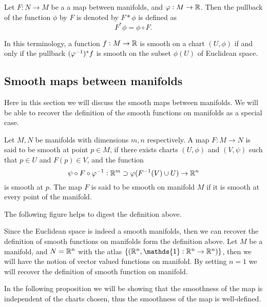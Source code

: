 \begin{definition}
	Let $ F: N\to M $ be a a map between manifolds, and $ \varphi: M \to \mathbb{R} $. Then the pullback of the function $ \phi $ by $ F $ is denoted by $ F*\phi $ is defined as 
	\[ F^* \phi = \phi\circ F. \]
\end{definition}

\begin{remark}
	In this terminology, a function $ f:M \to \mathbb{R} $ is smooth on a chart $ (U,\phi) $ if and only if the pullback $ (\varphi^{-1})^* f$ is smooth on the subset $ \phi(U) $ of Euclidean space.
\end{remark}

\subsection{Smooth maps between manifolds}
Here in this section we will discuss the smooth maps between manifolds. We will be able to recover the definition of the smooth functions on manifolds as a special case. 

\begin{definition}
	Let $ M, N $ be manifolds with dimensions $ m,n $ respectively. A map $ F: M \to N $ is said to be smooth at point $ p \in M $, if there exists charts $ (U,\phi) $ and $ (V,\psi) $ such that $ p \in U $ and $ F(p) \in V $, and the function 
	\[ \psi\circ F \circ \varphi^{-1}: \mathbb{R}^m \supset \varphi(F^{-1}(V) \cup U) \to \mathbb{R}^n  \]
	is smooth at $ p $. The map $ F $ is said to be smooth on manifold $ M $ if it is smooth at every point of the manifold.
\end{definition}
\begin{remark}
	The following figure helps to digest the definition above.
	
\end{remark}

\begin{remark}
	Since the Euclidean space is indeed a smooth manifolds, then we can recover the definition of smooth functions on manifolds form the definition above. Let $ M $ be a manifold, and $ N = \mathbb{R}^n $ with the atlas $ \set{(\R^n, \mathds{1}: \R^n \to \R^n)} $, then we will have the notion of vector valued functions on manifold. By setting $ n=1 $ we will recover the definition of smooth function on manifold.
\end{remark}

In the following proposition we will be showing that the smoothness of the map is independent of the charts chosen, thus the smoothness of the map is well-defined.

